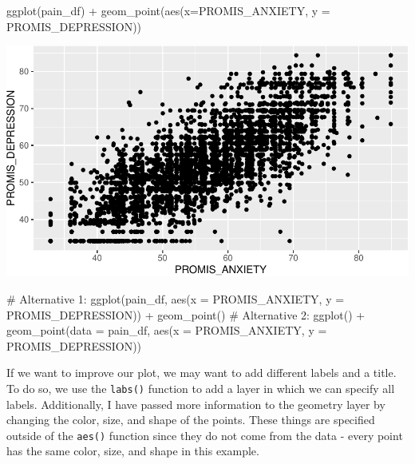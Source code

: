 \documentclass[
  letterpaper,
]{krantz}
\makeatletter
\newenvironment{Shaded}{\begin{snugshade}}{\end{snugshade}}
\newcommand{\AttributeTok}[1]{\textcolor[rgb]{0.40,0.45,0.13}{#1}}
\newcommand{\CommentTok}[1]{\textcolor[rgb]{0.37,0.37,0.37}{#1}}
\newcommand{\FunctionTok}[1]{\textcolor[rgb]{0.28,0.35,0.67}{#1}}
\newcommand{\NormalTok}[1]{\textcolor[rgb]{0.00,0.23,0.31}{#1}}
\newcommand{\SpecialCharTok}[1]{\textcolor[rgb]{0.37,0.37,0.37}{#1}}
\newenvironment{kframe}{%
\medskip{}
\setlength{\fboxsep}{.8em}
 \def\at@end@of@kframe{}%
 \ifinner\ifhmode%
  \def\at@end@of@kframe{\end{minipage}}%
  \begin{minipage}{\columnwidth}%
 \fi\fi%
 \def\FrameCommand##1{\hskip\@totalleftmargin \hskip-\fboxsep
 \colorbox{shadecolor}{##1}\hskip-\fboxsep
     \hskip-\linewidth \hskip-\@totalleftmargin \hskip\columnwidth}%
 \MakeFramed {\advance\hsize-\width
   \@totalleftmargin\z@ \linewidth\hsize
   \@setminipage}}%
 {\par\unskip\endMakeFramed%
 \at@end@of@kframe}
\renewenvironment{Shaded}{\begin{kframe}}{\end{kframe}}
\makeatother
\begin{document}
\begin{Shaded}
\begin{Highlighting}[]
\FunctionTok{ggplot}\NormalTok{(pain\_df) }\SpecialCharTok{+} \FunctionTok{geom\_point}\NormalTok{(}\FunctionTok{aes}\NormalTok{(}\AttributeTok{x=}\NormalTok{PROMIS\_ANXIETY, }
                                 \AttributeTok{y =}\NormalTok{ PROMIS\_DEPRESSION))}
\end{Highlighting}
\end{Shaded}

\begin{center}
\includegraphics[width=1\textwidth,height=\textheight]{book/visualization_ggplot_files/figure-pdf/unnamed-chunk-3-1.pdf}
\end{center}

\begin{Shaded}
\begin{Highlighting}[]
\CommentTok{\# Alternative 1:}
\FunctionTok{ggplot}\NormalTok{(pain\_df, }\FunctionTok{aes}\NormalTok{(}\AttributeTok{x =}\NormalTok{ PROMIS\_ANXIETY, }\AttributeTok{y =}\NormalTok{ PROMIS\_DEPRESSION)) }\SpecialCharTok{+} 
  \FunctionTok{geom\_point}\NormalTok{()}
\CommentTok{\# Alternative 2:}
\FunctionTok{ggplot}\NormalTok{() }\SpecialCharTok{+} 
  \FunctionTok{geom\_point}\NormalTok{(}\AttributeTok{data =}\NormalTok{ pain\_df, }\FunctionTok{aes}\NormalTok{(}\AttributeTok{x =}\NormalTok{ PROMIS\_ANXIETY, }
                                 \AttributeTok{y =}\NormalTok{ PROMIS\_DEPRESSION))}
\end{Highlighting}
\end{Shaded}

If we want to improve our plot, we may want to add different labels and
a title. To do so, we use the \texttt{labs()} function to add a layer in
which we can specify all labels. Additionally, I have passed more
information to the geometry layer by changing the color, size, and shape
of the points. These things are specified outside of the \texttt{aes()}
function since they do not come from the data - every point has the same
color, size, and shape in this example.
\end{document}
